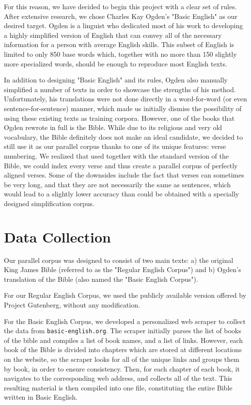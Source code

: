 \documentclass[11pt]{article}
\begin{document}
For this reason, we have decided to begin this project with a clear set of rules. After extensive research, we chose Charles Kay Ogden's "Basic English" as our desired target. Ogden is a linguist who dedicated most of his work to developing a highly simplified version of English that can convey all of the necessary information for a person with average English skills. This subset of English is limited to only 850 base words which, together with no more than 150 slightly more specialized words, should be enough to reproduce most English texts.

In addition to designing "Basic English" and its rules, Ogden also manually simplified a number of texts in order to showcase the strengths of his method. Unfortunately, his translations were not done directly in a word-for-word (or even sentence-for-sentence) manner, which made us initially dismiss the possibility of using these existing texts as training corpora. However, one of the books that Ogden rewrote in full is the Bible. While due to its religious and very old vocabulary, the Bible definitely does not make an ideal candidate, we decided to still use it as our parallel corpus thanks to one of its unique features: verse numbering. We realized that used together with the standard version of the Bible, we could index every verse and thus create a parallel corpus of perfectly aligned verses. Some of the downsides include the fact that verses can sometimes be very long, and that they are not necessarily the same as sentences, which would lead to a slightly lower accuracy than could be obtained with a specially designed simplification corpus.

\section{Data Collection}

Our parallel corpus was designed to consist of two main texts: a) the original King James Bible (referred to as the "Regular English Corpus") and b) Ogden's translation of the Bible (also named the "Basic English Corpus"). 

For our Regular English Corpus, we used the publicly available version offered by Project Gutenberg, without any modification.

For the Basic English Corpus, we developed a personalized web scraper to collect the data from {\small\tt basic-english.org}. The scraper initially parses the list of books of the bible and compiles a list of book names, and a list of links. However, each book of the Bible is divided into chapters which are stored at different locations on the website, so the scraper looks for all of the unique links and groups them by book, in order to ensure consistency. Then, for each chapter of each book, it navigates to the corresponding web address, and collects all of the text. This resulting material is then compiled into one file, constituting the entire Bible written in Basic English.
\end{document}
